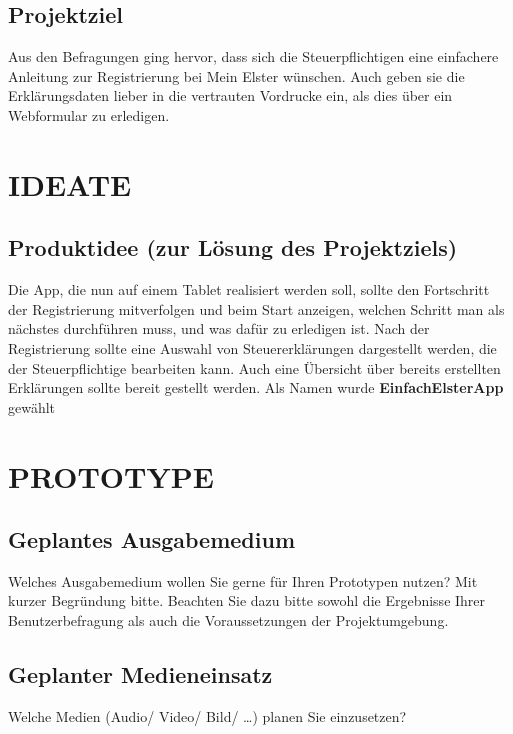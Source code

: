 \subsection{Projektziel}\label{Projektziel}

Aus den Befragungen ging hervor, dass sich die Steuerpflichtigen eine einfachere Anleitung zur Registrierung bei \grq{}Mein Elster\grq{} wünschen. Auch geben sie die Erklärungsdaten lieber in die vertrauten Vordrucke ein, als dies über ein Webformular zu erledigen.



\section{IDEATE}\label{IDEATE}


\subsection{Produktidee (zur Lösung des Projektziels)}\label{Produktidee (zur Lösung des Projektziels) }
Die App, die nun auf einem Tablet realisiert werden soll, sollte den Fortschritt der Registrierung mitverfolgen und beim Start anzeigen, welchen Schritt man als nächstes durchführen muss, und was dafür zu erledigen ist. Nach der Registrierung sollte eine Auswahl von Steuererklärungen dargestellt werden, die der Steuerpflichtige bearbeiten kann. Auch eine Übersicht über bereits erstellten Erklärungen sollte bereit gestellt werden. Als Namen wurde \grqq{}\textbf{EinfachElsterApp}\grqq{} gewählt


\section{PROTOTYPE}\label{PROTOTYPE}

\subsection{Geplantes Ausgabemedium}\label{Geplantes Ausgabemedium}
Welches Ausgabemedium wollen Sie gerne für Ihren Prototypen nutzen? Mit kurzer Begründung bitte. Beachten Sie dazu bitte sowohl die Ergebnisse Ihrer Benutzerbefragung als auch die Voraussetzungen der Projektumgebung.

\subsection{Geplanter Medieneinsatz}\label{Geplanter Medieneinsatz}
Welche Medien (Audio/ Video/ Bild/ …) planen Sie einzusetzen?


